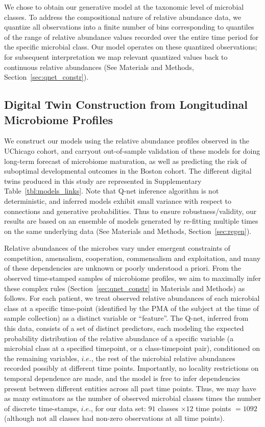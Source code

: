 \documentclass[onecolumn,10pt]{IEEEtran}
\def\qnet{Q-net\xspace}
\def\Methods{Materials and Methods}
\def\SPREFIX{S-}
\def\SPREFIX{}
\def\SUPPLEMENTARY{Supplementary\xspace}
\begin{document}
We chose to obtain our generative model at the taxonomic level of microbial classes. To address the compositional nature of relative abundance data, we quantize all observations into a finite number of bins corresponding to quantiles of the range of relative abundance values recorded over the entire time period for the specific microbial class.  Our model  operates on these quantized observations; for subsequent interpretation we map relevant quantized values back to continuous relative abundances (See \Methods, Section~\ref{sec:qnet_constr}). 

\subsection*{Digital Twin Construction from Longitudinal Microbiome Profiles}
We construct our models using the relative abundance profiles observed in the UChicago cohort, and carryout out-of-sample validation of these models for doing long-term forecast of microbiome maturation, as well as predicting the risk of suboptimal developmental outcomes in the Boston cohort. The different digital twins produced in this study are represented in  \SUPPLEMENTARY Table~\SPREFIX\ref{tbl:models_links}. Note that \qnet inference algorithm is not deterministic, and inferred models exhibit small variance with respect to connections and generative probabilities. Thus to ensure robustness/validity, our results are based on an ensemble of models generated by re-fitting multiple times on the same underlying data (See \Methods, Section~\ref{sec:regen}).

Relative abundances of the microbes vary under emergent constraints of competition, amensalism, cooperation, commensalism and exploitation, and many of these dependencies  are unknown or poorly understood a priori.  From the observed time-stamped samples of microbiome profiles, we aim to maximally infer these complex rules (Section~\ref{sec:qnet_constr} in \Methods) as follows. For each patient, we treat observed relative abundances of each microbial class at a specific time-point (identified by the PMA of the subject at the time of sample collection) as a  distinct variable or ``feature''. The \qnet, inferred from this data, consists of a set of distinct predictors, each modeling the  expected probability distribution of the relative abundance of a specific  variable (a microbial class at a specified timepoint, or a class-timepoint pair), conditioned on  the remaining variables, $i.e.$, the rest of the microbial relative abundances recorded possibly at different time points. Importantly, no locality restrictions on temporal dependence are made, and the model is free to infer  dependencies present between different entities across all past time points. Thus, we may have as many estimators as the number of observed microbial classes times the number of discrete time-stamps, $i.e.$, for our data set: $91$ classes $\times 12$ time points $= 1092$ (although not all classes had non-zero observations at all time points).
\end{document}
